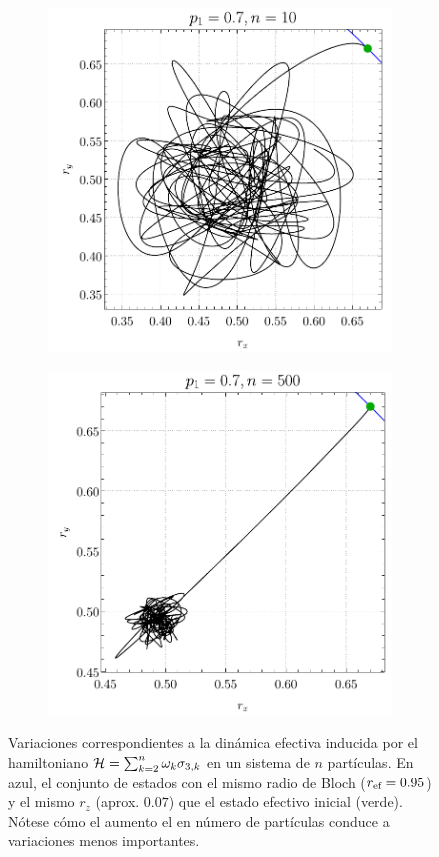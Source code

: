 \begin{figure}[ht!]
    \centering
    \begin{subfigure}{0.5\textwidth}
      \centering
      \includegraphics[width=0.9\linewidth]{chapter4/figures_separable/local_prefinv_ran_n=10_p=0.7_r=0.95_a=-3_b=3.pdf}
    \end{subfigure}%
    \begin{subfigure}{0.5\textwidth}
      \centering
      \includegraphics[width=0.9\linewidth]{chapter4/figures_separable/local_prefinv_ran_n=500_p=0.7_r=0.95_a=-3_b=3.pdf}
    \end{subfigure}
    \caption{Variaciones correspondientes a la dinámica efectiva inducida por el hamiltoniano $\mathcal{H}=\sum_{k=2}^{n}\omega_{k}\sigma_{3,k}$ en un sistema de $n$ partículas. En azul, el conjunto de estados con el mismo radio de Bloch ($r_{\text{ef}}=0.95$) y el mismo $r_{z}$ (aprox. $0.07$) que el estado efectivo inicial (verde). Nótese cómo el aumento el en número de partículas conduce a variaciones menos importantes. \label{fig:PrefInv2}}
\end{figure}

